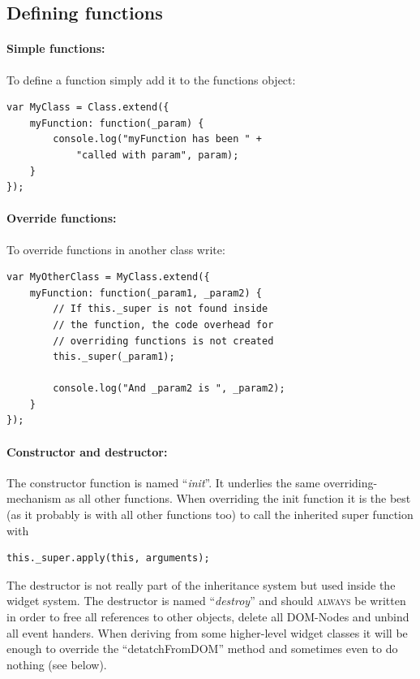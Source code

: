 \documentclass[10pt,a4paper]{report}
\begin{document}
\subsection*{Defining functions}

\paragraph{Simple functions:}
To define a function simply add it to the functions object:
\begin{verbatim}
var MyClass = Class.extend({
    myFunction: function(_param) {
    	console.log("myFunction has been " + 
    	    "called with param", param);
    }
});
\end{verbatim}

\paragraph{Override functions:}
To override functions in another class write:
\begin{verbatim}
var MyOtherClass = MyClass.extend({
    myFunction: function(_param1, _param2) {
        // If this._super is not found inside
        // the function, the code overhead for
        // overriding functions is not created
        this._super(_param1);
		
        console.log("And _param2 is ", _param2);
    }
});
\end{verbatim}

\paragraph{Constructor and destructor:}
The constructor function is named ``\textit{init}''. It underlies the same overriding-mechanism as all other functions. When overriding the init function it is the best (as it probably is with all other functions too) to call the inherited super function with
\begin{verbatim}
this._super.apply(this, arguments);
\end{verbatim}
The destructor is not really part of the inheritance system but used inside the widget system. The destructor is named ``\textit{destroy}'' and should \textsc{always} be written in order to free all references to other objects, delete all DOM-Nodes and unbind all event handers. When deriving from some higher-level widget classes it will be enough to override the ``detatchFromDOM'' method and sometimes even to do nothing (see below).
\end{document}
